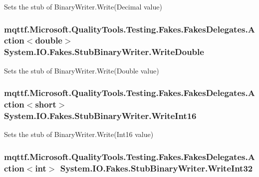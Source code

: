 Sets the stub of Binary\-Writer.\-Write(\-Decimal value)

\hypertarget{class_system_1_1_i_o_1_1_fakes_1_1_stub_binary_writer_afdb35fb5d007a2000c8ec5fe9bb9eecb}{
\subsubsection[{Write\-Double}]{\setlength{\rightskip}{0pt plus 5cm}mqttf.\-Microsoft.\-Quality\-Tools.\-Testing.\-Fakes.\-Fakes\-Delegates.\-Action$<$double$>$ System.\-I\-O.\-Fakes.\-Stub\-Binary\-Writer.\-Write\-Double}}\label{class_system_1_1_i_o_1_1_fakes_1_1_stub_binary_writer_afdb35fb5d007a2000c8ec5fe9bb9eecb}


Sets the stub of Binary\-Writer.\-Write(\-Double value)

\hypertarget{class_system_1_1_i_o_1_1_fakes_1_1_stub_binary_writer_ac9ffdc9dda990a969fb6b9604ee9e88e}{
\subsubsection[{Write\-Int16}]{\setlength{\rightskip}{0pt plus 5cm}mqttf.\-Microsoft.\-Quality\-Tools.\-Testing.\-Fakes.\-Fakes\-Delegates.\-Action$<$short$>$ System.\-I\-O.\-Fakes.\-Stub\-Binary\-Writer.\-Write\-Int16}}\label{class_system_1_1_i_o_1_1_fakes_1_1_stub_binary_writer_ac9ffdc9dda990a969fb6b9604ee9e88e}


Sets the stub of Binary\-Writer.\-Write(\-Int16 value)

\hypertarget{class_system_1_1_i_o_1_1_fakes_1_1_stub_binary_writer_ace5194839f1cff267435f04155024a5d}{
\subsubsection[{Write\-Int32}]{\setlength{\rightskip}{0pt plus 5cm}mqttf.\-Microsoft.\-Quality\-Tools.\-Testing.\-Fakes.\-Fakes\-Delegates.\-Action$<$int$>$ System.\-I\-O.\-Fakes.\-Stub\-Binary\-Writer.\-Write\-Int32}}\label{class_system_1_1_i_o_1_1_fakes_1_1_stub_binary_writer_ace5194839f1cff267435f04155024a5d}



